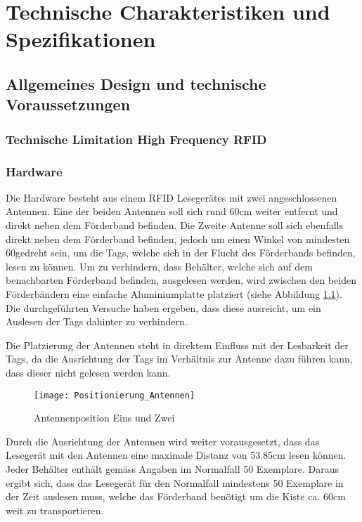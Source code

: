 \chapter{Technische Charakteristiken und Spezifikationen}

\section{Allgemeines Design und technische Voraussetzungen}

\subsection{Technische Limitation High Frequency RFID}

\subsection{Hardware}
Die Hardware besteht aus einem RFID Lesegerätes mit zwei angeschlossenen Antennen. Eine der beiden Antennen soll sich rund 60cm weiter entfernt und direkt neben dem Förderband befinden. Die Zweite Antenne soll sich ebenfalls direkt neben dem Förderband befinden, jedoch um einen Winkel von mindesten 60\SIUnitSymbolDegree gedreht sein, um die Tags, welche sich in der Flucht des Förderbands befinden, lesen zu können. Um zu verhindern, dass Behälter, welche sich auf dem benachbarten Förderband befinden, ausgelesen werden, wird zwischen den beiden Förderbändern eine einfache Aluminiumplatte platziert (siehe Abbildung \ref{fig:positionAntennen}). Die durchgeführten Versuche haben ergeben, dass diese ausreicht, um ein Auslesen der Tags dahinter zu verhindern.

Die Platzierung der Antennen steht in direktem Einfluss mit der Lesbarkeit der Tags, da die Ausrichtung der Tags im Verhältnis zur Antenne dazu führen kann, dass dieser nicht gelesen werden kann.

\begin{figure}
	\centering
	\texttt{[image: Positionierung\_Antennen]}
	\caption{Antennenposition Eins und Zwei}
	\label{fig:positionAntennen}
\end{figure}


Durch die Ausrichtung der Antennen wird weiter vorausgesetzt, dass das Lesegerät mit den Antennen eine maximale Distanz von 53.85cm lesen können. Jeder Behälter enthält gemäss Angaben im Normalfall 50 Exemplare. Daraus ergibt sich, dass das Lesegerät für den Normalfall mindestens 50 Exemplare in der Zeit auslesen muss, welche das Förderband benötigt um die Kiste ca. 60cm weit zu transportieren.

